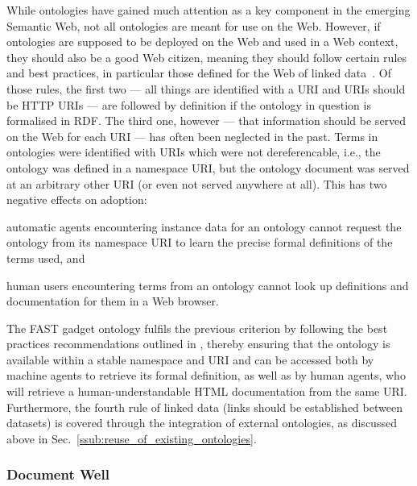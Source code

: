 \documentclass{article}
\begin{document}
While ontologies have gained much attention as a key component in the emerging Semantic Web, not all ontologies are meant for use on the Web. However, if ontologies are supposed to be deployed on the Web and used in a Web context, they should also be a good Web citizen, meaning they should follow certain rules and best practices, in particular those defined for the Web of linked data~\cite{bernersLee2006linkedData}. Of those rules, the first two --- all things are identified with a URI and URIs should be HTTP URIs --- are followed by definition if the ontology in question is formalised in RDF. The third one, however --- that information should be served on the Web for each URI --- has often been neglected in the past. Terms in ontologies were identified with URIs which were not dereferencable, i.e., the ontology was defined in a namespace URI, but the ontology document was served at an arbitrary other URI (or even not served anywhere at all). This has two negative effects on adoption:
\begin{inparaenum}[(i)]
	\item automatic agents encountering instance data for an ontology cannot request the ontology from its namespace URI to learn the precise formal definitions of the terms used, and
	\item human users encountering terms from an ontology cannot look up definitions and documentation for them in a Web browser. 
\end{inparaenum}

The FAST gadget ontology fulfils the previous criterion by following the best practices recommendations outlined in \cite{berrueta2008publishing_rdf_vocabularies}, thereby ensuring that the ontology is available within a stable namespace and URI and can be accessed both by machine agents to retrieve its formal definition, as well as by human agents, who will retrieve a human-understandable HTML documentation from the same URI. Furthermore, the fourth rule of linked data (links should be established between datasets) is covered through the integration of external ontologies, as discussed above in Sec.~\ref{ssub:reuse_of_existing_ontologies}.


\subsubsection{Document Well} %
\label{ssub:be_well_documented}
\end{document}

